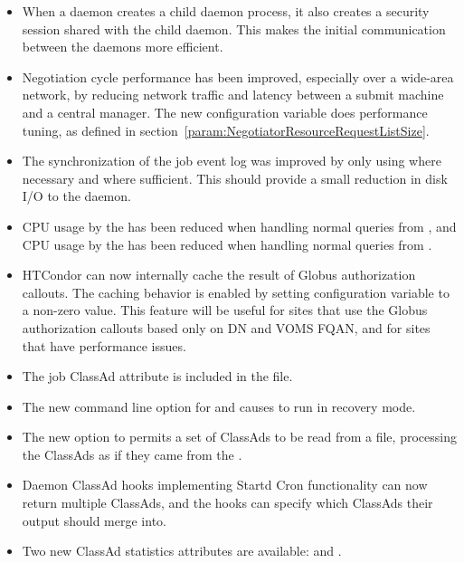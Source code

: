 \begin{itemize}

\item When a daemon creates a child daemon process, it also creates a
security session shared with the child daemon.
This makes the initial communication between the daemons more efficient.

\item Negotiation cycle performance has been improved, especially
over a wide-area network, by reducing network traffic and latency
between a submit machine and a central manager.
The new configuration variable 
does performance tuning, as defined 
in section~\ref{param:NegotiatorResourceRequestListSize}.

\item The synchronization of the job event log was improved by only
using  where necessary and 
 where sufficient.  
This should provide a small reduction in disk I/O to 
the  daemon.

\item CPU usage by the  has been reduced when
handling normal queries from ,
and CPU usage by the  has been reduced when
handling normal queries from .

\item HTCondor can now internally cache the result of Globus authorization
callouts.  
The caching behavior is enabled by setting configuration variable
 to a non-zero value.
This feature will be useful for sites that use the Globus authorization
callouts based only on DN and VOMS FQAN, and for sites that have 
performance issues.

\item The job ClassAd attribute  is included in 
the  file.

\item The new  command line option for 
and  causes  to run in
recovery mode.

\item The new  option to  permits a set of ClassAds
to be read from a file, processing the ClassAds as if they came from
the .

\item Daemon ClassAd hooks implementing Startd Cron functionality  
can now return multiple ClassAds,
and the hooks can specify which ClassAds their output should merge into.

\item Two new  ClassAd statistics attributes are
available:  and .

\end{itemize}

